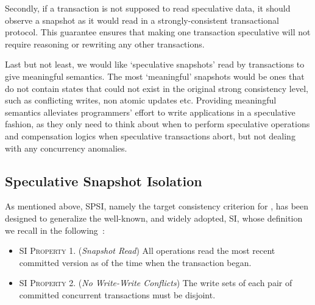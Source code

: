 Secondly, if a transaction is not supposed to read speculative data, it should observe a snapshot as it would read in a strongly-consistent transactional protocol. This guarantee ensures that making one transaction speculative will not require reasoning or rewriting any other transactions.

Last but not least, we would like `speculative snapshots' read by transactions to give meaningful semantics. The most `meaningful' snapshots would be ones that do not contain states that could not exist in the original strong consistency level, such as conflicting writes, non atomic updates etc. Providing meaningful semantics alleviates programmers' effort to write applications in a speculative fashion, as they only need to think about when to perform speculative operations and compensation logics when speculative transactions abort, but not dealing with any concurrency anomalies. 

\subsection{Speculative Snapshot Isolation}
\label{subsec:ssi}
As mentioned above, SPSI, namely the target consistency criterion for \specula, has been designed to generalize the well-known, and widely adopted, SI, whose definition we recall in the following~\cite{weikum2001transactional}:

\begin{itemize}
\item \textsc{SI Property 1.} (\textit{Snapshot Read}) All operations read the most
recent committed version as of the time when the transaction began.
\item \textsc{SI Property 2.} (\textit{No Write-Write Conflicts}) The write sets of
each pair of committed concurrent transactions must be disjoint.
\end{itemize}

\iffalse
The design process that led us to the definition of SPSI has been driven by three main goals/requirements:
\begin{itemize}
\item providing meaningful correctness guarantees in presence of executions encompassing both speculatively and final committed transactions;
\item preserving the intuitiveness and simplicity of the original SI specification;
\item enabling highly scalable and efficient implementations, in which transactions can be speculatively committed after a local certification phase.

Guided by these three objectives,
\end{itemize}
\fi

